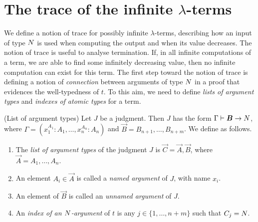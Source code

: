 \section{The trace of the infinite $\lambda$-terms}\label{section-trace-infinite-lambda-terms}

We define a notion of trace for possibly infinite $\lambda$-terms, 
describing how an input of type ${N}$ is used when computing the output
and when its value decreases. The notion of trace is useful to analyse termination.
If, in all infinite computations of a term, we are able to find some infinitely
decreasing value, then no infinite computation can exist for this term. 
The first step toward the notion of trace is defining a notion of \emph{connection} 
between arguments of type ${N}$ in a proof that evidences the well-typedness of $t$. 
To this aim, we need to define \emph{lists of argument types} and \emph{indexes of atomic types} for a term.

%
%

\begin{definition}(List of argument types)
Let $J$ be a judgment.
Then $J$ has the form $\Gamma \vdash \vec{B}\rightarrow \N$,
where $\Gamma = (x_1^{A_1}:A_1,\ldots, x_n^{A_n}:A_n)$ and $\vec{B}=B_{n+1}, \ldots, B_{n+m}$. 
We define as follows.

\begin{enumerate}
\item
The \emph{list of argument types} of the judgment $J$ is $\vec{C} = \vec{A},\vec{B}$,
where $\vec{A} = A_1,\ldots,A_n$.

\item
An element $A_i \in \vec{A}$ is called a \emph{named argument} of $J$, with name $x_i$.
    
\item
An element of $\vec{B}$ is called an \emph{unnamed argument} of $J$. 

\item
An \emph{index of an ${N}$-argument} 
of $t$ is any $j \in \{1, \ldots, n+m\}$ such that $C_j = {N}$.

\end{enumerate}
\end{definition}

